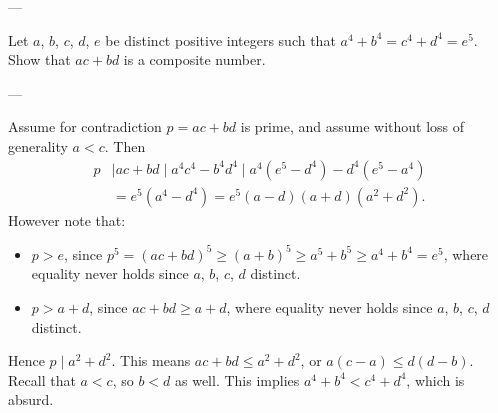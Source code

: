 
---

Let $a$, $b$, $c$, $d$, $e$ be distinct positive integers such that $a^4+b^4=c^4+d^4=e^5$. Show that $ac+bd$ is a composite number.

---

Assume for contradiction $p=ac+bd$ is prime, and assume without loss of generality $a<c$. Then
\begin{align*}
    p&\mid ac+bd
    \mid a^4c^4-b^4d^4
    \mid a^4\left(e^5-d^4\right)-d^4\left(e^5-a^4\right)\\
    &=e^5\left(a^4-d^4\right)
    =e^5(a-d)(a+d)\left(a^2+d^2\right).
\end{align*}
However note that:
\begin{itemize}
    \item $p>e$, since $p^5=(ac+bd)^5\ge(a+b)^5\ge a^5+b^5\ge a^4+b^4=e^5$, where equality never holds since $a$, $b$, $c$, $d$ distinct.
    \item $p>a+d$, since $ac+bd\ge a+d$, where equality never holds since $a$, $b$, $c$, $d$ distinct.
\end{itemize}
Hence $p\mid a^2+d^2$. This means $ac+bd\le a^2+d^2$, or $a(c-a)\le d(d-b)$. Recall that $a<c$, so $b<d$ as well. This implies $a^4+b^4<c^4+d^4$, which is absurd.

